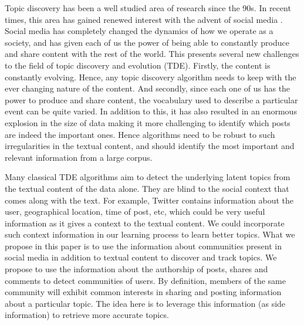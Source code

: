 %


Topic discovery has been a well studied
area of research since the 90s.  In recent times, this area has gained renewed interest with the
advent of social media \cite{Sayyadi:2009, Becker:2009}.  Social media has completely changed the dynamics of how we operate as a
society, and has given each of us the power of being able to constantly produce and
share content with the rest of the world.  This presents several new challenges to the field of
topic discovery and evolution (TDE).  Firstly, the content is constantly evolving.  Hence, any topic discovery algorithm
needs to keep with the ever changing nature of the content.  And secondly, since each one of us has the power
to produce and share content, the vocabulary used to describe a particular event can be quite varied.  In addition to this,
it has also resulted in an enormous explosion in the size of data making it more challenging to identify
which posts are indeed the important ones.
Hence algorithms need to be robust to such irregularities in the textual content, and should identify
the most important and relevant information from a large corpus.

Many classical TDE algorithms aim to detect the underlying latent topics from
the textual content of the data alone.  They are blind to the social context that comes along with the
text.  For example, Twitter contains information about the user, geographical
location, time of post, etc, which could be very useful information as
it gives a context to the textual
content.  We could incorporate such context information in our learning process
to learn better topics.
What we propose in this paper is to use the information about communities present
in social media in addition to textual content to discover and track topics. 
We propose to use the information about the authorship of posts, shares and comments to
detect communities
of users.  By definition, members of the same community will exhibit
common interests in sharing and posting information about a particular topic.  The idea here is to
leverage this information (as side information) to retrieve more accurate topics.


